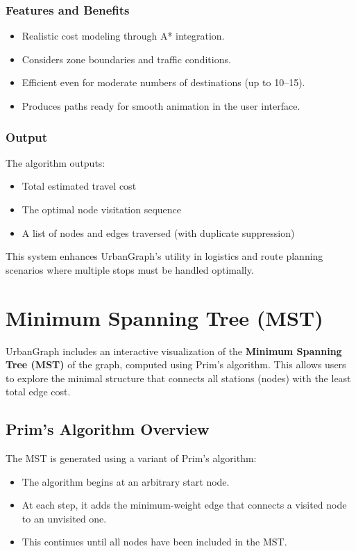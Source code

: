 \documentclass[12pt]{article}
\begin{document}
\subsubsection*{Features and Benefits}


\begin{itemize}
    \item Realistic cost modeling through A* integration.
    \item Considers zone boundaries and traffic conditions.
    \item Efficient even for moderate numbers of destinations (up to 10–15).
    \item Produces paths ready for smooth animation in the user interface.
\end{itemize}

\subsubsection*{Output}

The algorithm outputs:
\begin{itemize}
    \item Total estimated travel cost
    \item The optimal node visitation sequence
    \item A list of nodes and edges traversed (with duplicate suppression)
\end{itemize}

This system enhances UrbanGraph’s utility in logistics and route planning scenarios where multiple stops must be handled optimally.


\section{Minimum Spanning Tree (MST)}

UrbanGraph includes an interactive visualization of the \textbf{Minimum Spanning Tree (MST)} of the graph, computed using Prim’s algorithm. This allows users to explore the minimal structure that connects all stations (nodes) with the least total edge cost.

\subsection*{Prim's Algorithm Overview}

The MST is generated using a variant of Prim’s algorithm:
\begin{itemize}
    \item The algorithm begins at an arbitrary start node.
    \item At each step, it adds the minimum-weight edge that connects a visited node to an unvisited one.
    \item This continues until all nodes have been included in the MST.
\end{itemize}
\end{document}
